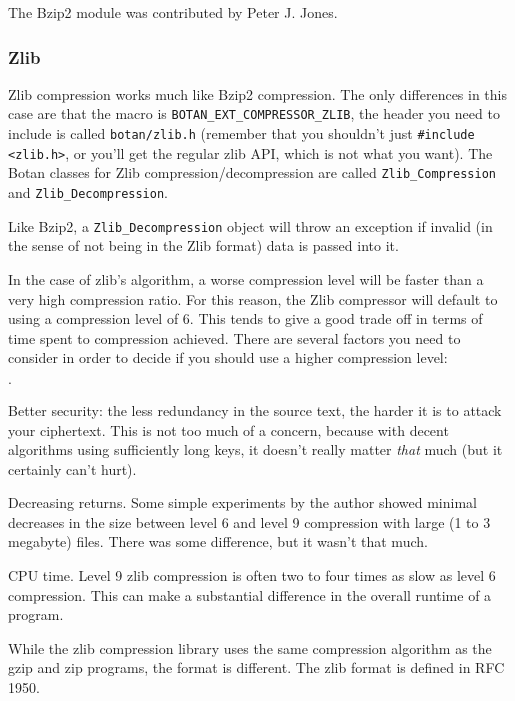 \documentclass{article}
\newcommand{\filename}[1]{\texttt{#1}}
\newcommand{\macro}[1]{\texttt{#1}}
\newcommand{\type}[1]{\texttt{#1}}
\begin{document}
The Bzip2 module was contributed by Peter J. Jones.

\subsubsection{Zlib}

Zlib compression works much like Bzip2 compression. The only
differences in this case are that the macro is
\macro{BOTAN\_EXT\_COMPRESSOR\_ZLIB}, the header you need to include
is called \filename{botan/zlib.h} (remember that you shouldn't just
\verb|#include <zlib.h>|, or you'll get the regular zlib API, which is
not what you want). The Botan classes for Zlib
compression/decompression are called \type{Zlib\_Compression} and
\type{Zlib\_Decompression}.

Like Bzip2, a \type{Zlib\_Decompression} object will throw an exception if
invalid (in the sense of not being in the Zlib format) data is passed into it.

In the case of zlib's algorithm, a worse compression level will be faster than
a very high compression ratio. For this reason, the Zlib compressor will
default to using a compression level of 6. This tends to give a good trade off
in terms of time spent to compression achieved. There are several factors you
need to consider in order to decide if you should use a higher compression
level:

\begin{list}{$\cdot$}
  \item Better security: the less redundancy in the source text, the harder it
        is to attack your ciphertext. This is not too much of a concern,
        because with decent algorithms using sufficiently long keys, it doesn't
        really matter \emph{that} much (but it certainly can't hurt).
  \item

  \item Decreasing returns. Some simple experiments by the author showed
        minimal decreases in the size between level 6 and level 9 compression
        with large (1 to 3 megabyte) files. There was some difference, but it
        wasn't that much.

  \item CPU time. Level 9 zlib compression is often two to four times as slow
        as level 6 compression. This can make a substantial difference in the
        overall runtime of a program.
\end{list}

While the zlib compression library uses the same compression algorithm as the
gzip and zip programs, the format is different. The zlib format is defined in
RFC 1950.
\end{document}
